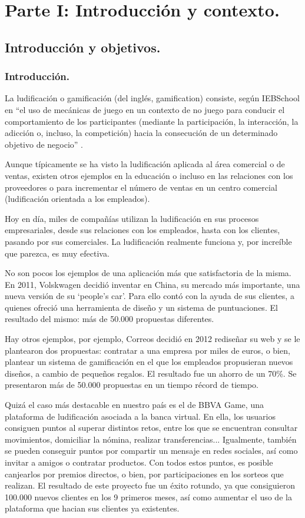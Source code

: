 \documentclass[twoside]{report}
\begin{document}
\tableofcontents

\clearpage
{}
\chapter{Parte I: Introducción y contexto.}
\section{Introducción y objetivos.}
\subsection{Introducción.}
La ludificación o gamificación (del inglés, gamification) consiste, según IEBSchool en “el uso de mecánicas de juego en un contexto de no juego para conducir el comportamiento de los participantes (mediante la participación, la interacción, la adicción o, incluso, la competición) hacia la consecución de un determinado objetivo de negocio” \cite{iebschoolGami}. 

Aunque típicamente se ha visto la ludificación aplicada al área comercial o de ventas, existen otros ejemplos en la educación o incluso en las relaciones con los proveedores o para incrementar el número de ventas en un centro comercial (ludificación orientada a los empleados).

Hoy en día, miles de compañías utilizan la ludificación en sus procesos empresariales, desde sus relaciones con los empleados, hasta con los clientes, pasando por sus comerciales. La ludificación realmente funciona y, por increíble que parezca, es muy efectiva.

No son pocos los ejemplos de una aplicación más que satisfactoria de la misma. En 2011, Volskwagen decidió inventar en China, su mercado más importante, una nueva versión de su ‘people’s car’. Para ello contó con la ayuda de sus clientes, a quienes ofreció una herramienta de diseño y un sistema de puntuaciones. El resultado del mismo: más de 50.000 propuestas diferentes.

Hay otros ejemplos, por ejemplo, Correos decidió en 2012 rediseñar su web y se le plantearon dos propuestas: contratar a una empresa por miles de euros, o bien, plantear un sistema de gamificación en el que los empleados propusieran nuevos diseños, a cambio de pequeños regalos. El resultado fue un ahorro de un 70\%. Se presentaron más de 50.000 propuestas en un tiempo récord de tiempo.

Quizá el caso más destacable en nuestro país es el de BBVA Game\cite{bbvag}, una plataforma de ludificación asociada a la banca virtual. En ella, los usuarios consiguen puntos al superar distintos retos, entre los que se encuentran consultar movimientos, domiciliar la nómina, realizar transferencias... Igualmente, también se pueden conseguir puntos por compartir un mensaje en redes sociales, así como invitar a amigos o contratar productos. Con todos estos puntos, es posible canjearlos por premios directos, o bien, por participaciones en los sorteos que realizan. El resultado de este proyecto fue un éxito rotundo, ya que consiguieron 100.000 nuevos clientes en los 9 primeros meses, así como aumentar el uso de la plataforma que hacian sus clientes ya existentes.
\end{document}
